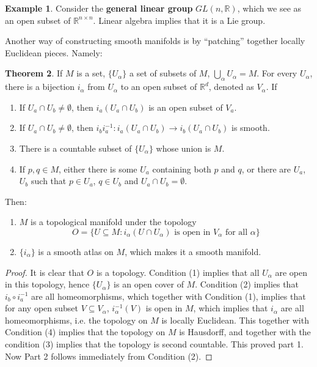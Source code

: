 \documentclass{article}
\theoremstyle{definition}
\newtheorem{thm}{Theorem}[section]
\newtheorem{exm}[thm]{Example}
\begin{document}
\begin{exm}
    Consider the {\bf general linear group} $GL(n, \mathbb{R})$, which we see as an open subset of $\mathbb{R}^{n\times n}$. Linear algebra implies that it is a Lie group.
\end{exm}

Another way of constructing smooth manifolds is by ``patching'' together locally Euclidean pieces. Namely:

\begin{thm}\label{patch}
    If $M$ is a set, $\{U_\alpha\}$ a set of subsets of $M$, $\bigcup_\alpha U_\alpha=M$. For every $U_\alpha$, there is a bijection $i_\alpha$ from $U_\alpha$ to an open subset of $\mathbb{R}^d$, denoted as $V_\alpha$. If
    \begin{enumerate}[(1)]
        \item If $U_a\cap U_b\not=\emptyset$, then $i_a(U_a\cap U_b)$ is an open subset of $V_a$.
        \item If $U_a\cap U_b\not=\emptyset$, then $i_bi_a^{-1}: i_a(U_a\cap U_b)\rightarrow i_b(U_a\cap U_b)$ is smooth.
        \item There is a countable subset of $\{U_\alpha\}$ whose union is $M$.
        \item If $p, q\in M$, either there is some $U_a$ containing both $p$ and $q$, or there are $U_a$, $U_b$ such that $p\in U_a$, $q\in U_b$ and $U_a\cap U_b=\emptyset$.
    \end{enumerate}
    Then:
    \begin{enumerate}
        \item $M$ is a topological manifold under the topology 
        \[O=\{U\subseteq M: i_\alpha(U\cap U_\alpha)\text{ is open in }V_\alpha\text{ for all }\alpha\}\]
        \item $\{i_\alpha\}$ is a smooth atlas on $M$, which makes it a smooth manifold.
    \end{enumerate}
\end{thm}

\begin{proof}
     It is clear that $O$ is a topology. Condition (1) implies that all $U_\alpha$ are open in this topology, hence $\{U_\alpha\}$ is an open cover of $M$. Condition (2) implies that $i_b\circ i_a^{-1}$ are all homeomorphisms, which together with Condition (1), implies that for any open subset $V\subseteq V_\alpha$, $i_\alpha^{-1}(V)$ is open in $M$, which implies that $i_\alpha$ are all homeomorphisms, i.e. the topology on $M$ is locally Euclidean. This together with Condition (4) implies that the topology on $M$ is Hausdorff, and together with the condition (3) implies that the topology is second countable. This proved part 1. Now Part 2 follows immediately from Condition (2).
\end{proof}
\end{document}
